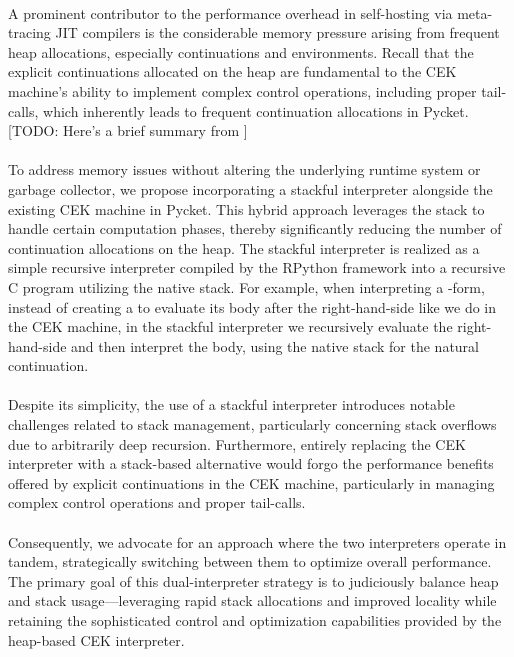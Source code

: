     \paragraph{}%
      A prominent contributor to the performance overhead in self-hosting via meta-tracing JIT compilers is the considerable memory pressure arising from frequent heap allocations, especially continuations and environments. Recall that the explicit continuations allocated on the heap are fundamental to the CEK machine's ability to implement complex control operations, including proper tail-calls, which inherently leads to frequent continuation allocations in Pycket. [TODO: Here's a brief summary from ]

    \paragraph{}%
      To address memory issues without altering the underlying runtime system or garbage collector, we propose incorporating a stackful interpreter alongside the existing CEK machine in Pycket. This hybrid approach leverages the stack to handle certain computation phases, thereby significantly reducing the number of continuation allocations on the heap. The stackful interpreter is realized as a simple recursive interpreter compiled by the RPython framework into a recursive C program utilizing the native stack. For example, when interpreting a -form, instead of creating a  to evaluate its body after the right-hand-side like we do in the CEK machine, in the stackful interpreter we recursively evaluate the right-hand-side and then interpret the body, using the native stack for the natural continuation.

    \paragraph{}%
      Despite its simplicity, the use of a stackful interpreter introduces notable challenges related to stack management, particularly concerning stack overflows due to arbitrarily deep recursion. Furthermore, entirely replacing the CEK interpreter with a stack-based alternative would forgo the performance benefits offered by explicit continuations in the CEK machine, particularly in managing complex control operations and proper tail-calls.

    \paragraph{}%
      Consequently, we advocate for an approach where the two interpreters operate in tandem, strategically switching between them to optimize overall performance. The primary goal of this dual-interpreter strategy is to judiciously balance heap and stack usage—leveraging rapid stack allocations and improved locality while retaining the sophisticated control and optimization capabilities provided by the heap-based CEK interpreter.

